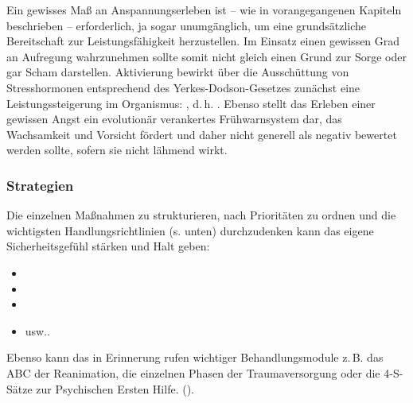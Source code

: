 {Ein gewisses Maß an
Anspannungserleben ist -- wie in vorangegangenen Kapiteln
beschrieben -- erforderlich, ja sogar unumgänglich, um eine
grundsätzliche Bereitschaft zur Leistungsfähigkeit
herzustellen. Im Einsatz einen gewissen Grad an Aufregung
wahrzunehmen sollte somit nicht gleich einen Grund zur Sorge
oder gar Scham darstellen. Aktivierung bewirkt über die
Ausschüttung von Stresshormonen entsprechend des
Yerkes-Dodson-Gesetzes zunächst eine Leistungssteigerung im
Organismus: , d.\,h.
.  Ebenso
stellt das Erleben einer gewissen Angst ein evolutionär verankertes
Frühwarnsystem dar, das Wachsamkeit und Vorsicht fördert und
daher nicht generell als negativ bewertet werden sollte,
sofern sie nicht lähmend wirkt.}
{}
{}
{}
{}





\subsubsection{ Strategien}

{Die einzelnen
Maßnahmen zu strukturieren, nach Prioritäten zu ordnen und
die wichtigsten Handlungsrichtlinien (s. unten)
durchzudenken kann das eigene Sicherheitsgefühl stärken und
Halt geben:

\begin{itemize}
  \item {}
  \item {}
  \item {}
  \item {} usw..
\end{itemize}

Ebenso kann das in  Erinnerung rufen wichtiger
Behandlungsmodule z.\,B. das ABC der Reanimation, die
einzelnen Phasen der Traumaversorgung oder die 4-S-Sätze zur
Psychischen Ersten Hilfe. 
(\cite{Karutz200912}).}
{}
{}
{}
{}



